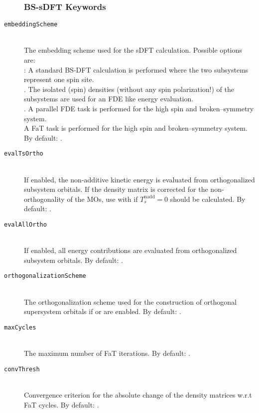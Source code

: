 \begin{description}
\subsubsection{BS-sDFT Keywords}
	\item [\texttt{embeddingScheme}]\hfill \\
	The embedding scheme used for the sDFT calculation. Possible options are: \\
    : A standard BS-DFT calculation is performed where the two subsystems 
    represent one spin site.\\
	. The isolated (spin) densities (without any spin polarization!) of the 
	subsystems are used for an FDE like energy evaluation.\\ 
	. A parallel FDE task is performed for the high spin and broken--symmetry
	system.\\ 
	 A FaT task is performed for the high spin and broken--symmetry
	system.\\
	By default: .
	\item [\texttt{evalTsOrtho}]\hfill \\
	If enabled, the non-additive kinetic energy is evaluated from orthogonalized subsystem 
	orbitals. If  the density matrix is corrected for
	the non-orthogonality of the MOs, use  with  
	if $T_s^\text{nadd}=0$ should be calculated. By default: .
	\item [\texttt{evalAllOrtho}]\hfill \\
	If enabled, all energy contributions are evaluated from orthogonalized subsystem orbitals.
	By default: .
	\item [\texttt{orthogonalizationScheme}]\hfill \\ The orthogonalization scheme used
	for the construction of orthogonal supersystem orbitals if  or  are enabled.
	By default: .
	\item [\texttt{maxCycles}]\hfill \\ The maximum number of FaT iterations.
	By default: .
	\item [\texttt{convThresh}]\hfill \\ Convergence criterion for the absolute change
	of the density matrices w.r.t FaT cycles.
	By default: .
\end{description}
